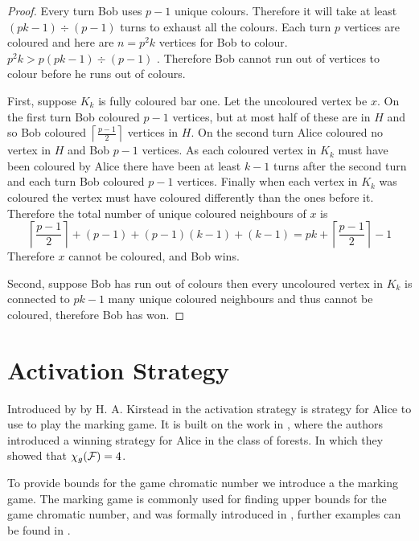 \begin{proof}
Every turn Bob uses $p-1$ unique colours. Therefore it will take at least $(pk-1)\div(p-1)$ turns to exhaust all the colours. Each turn $p$ vertices are coloured and here are $n=p^2k$ vertices for Bob to colour. $p^2k > p(pk-1)\div(p-1)$ . Therefore Bob cannot run out of vertices to colour before he runs out of colours.

First, suppose $K_k$ is fully coloured bar one. Let the uncoloured vertex be $x$. On the first turn Bob coloured $p-1$ vertices, but at most half of these are in $H$ and so Bob coloured $\left\lceil \frac{p-1}{2}\right\rceil$ vertices in $H$. On the second turn Alice coloured no vertex in $H$ and Bob $p-1$ vertices. As each coloured vertex in $K_k$ must have been coloured by Alice there have been at least $k-1$ turns after the second turn and each turn Bob coloured $p-1$ vertices. Finally when each vertex in $K_k$ was coloured the vertex must have coloured differently than the ones before it. Therefore the total number of unique coloured neighbours of $x$ is 
%
\[\left\lceil \frac{p-1}{2}\right\rceil+(p-1) +(p-1)(k-1)+(k-1)=pk+\left\lceil \frac{p-1}{2}\right\rceil-1\]
%
Therefore $x$ cannot be coloured, and Bob wins.

Second, suppose Bob has run out of colours then every uncoloured vertex in $K_k$ is connected to $pk-1$ many unique coloured neighbours and thus cannot be coloured, therefore Bob has won.
\end{proof}

\section{Activation Strategy}

Introduced by by H. A. Kirstead in \cite{KIERSTEAD2000} the activation strategy is strategy for Alice to use to play the marking game. It is built on the work in \cite{faKeKiTr1993}, where the authors introduced a winning strategy for Alice in the class of forests. In which they showed that $\chi_g(\mathcal{F})=4$. 

To provide bounds for the game chromatic number we introduce a the marking game. The marking game is commonly used for finding upper bounds for the game chromatic number, and was formally introduced in \cite{Zhu1999}, further examples can be found in  \cite{KIERSTEAD2000,Zhu2008}.

